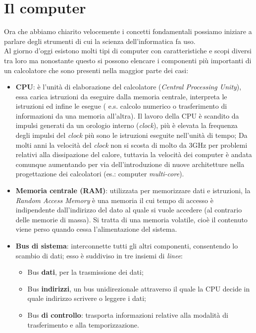 \section{Il computer}
Ora che abbiamo chiarito velocemente i concetti fondamentali possiamo iniziare a parlare degli strumenti di cui la scienza dell'informatica fa uso. \\
Al giorno d'oggi esistono molti tipi di computer con caratteristiche e scopi diversi tra loro ma nonostante questo si possono elencare i componenti più importanti di un calcolatore che sono presenti nella maggior parte dei casi:
	\begin{itemize}
	\item\textbf{CPU}: è l’unità di elaborazione del calcolatore (\textit{Central Processing Unity}), essa carica istruzioni da eseguire dalla memoria centrale, interpreta le istruzioni ed infine le esegue ( e.s. calcolo numerico o trasferimento di informazioni da una memoria all’altra).
	Il lavoro della CPU è scandito da impulsi generati da un orologio interno (\textit{clock}), più è elevata la frequenza degli impulsi del \textit{clock} più sono le istruzioni eseguite nell’unità di tempo; Da molti anni la velocità del \textit{clock} non si scosta di molto da 3GHz per problemi relativi alla dissipazione del calore, tuttavia la velocità dei computer è andata comunque aumentando per via dell'introduzione di nuove architetture nella progettazione dei calcolatori (es.: computer \textit{multi-core}).
	\item\textbf{Memoria centrale (RAM)}: utilizzata per memorizzare dati e istruzioni, la \textit{Random Access Memory} è una memoria il cui tempo di accesso è indipendente dall’indirizzo del dato al quale si vuole accedere (al contrario delle memorie di massa). Si tratta di una memoria volatile, cioè il contenuto viene perso quando cessa l’alimentazione del sistema.
	\item\textbf{Bus di sistema}: interconnette tutti gli altri componenti, consentendo lo scambio di dati; esso è suddiviso in tre insiemi di \textit{linee}: 
	\begin{itemize}
		\item Bus \textbf{dati}, per la trasmissione dei dati; 
		\item Bus \textbf{indirizzi}, un bus unidirezionale attraverso il quale la CPU decide in quale indirizzo scrivere o leggere i dati;
		\item Bus \textbf{di controllo}: trasporta informazioni relative alla modalità di trasferimento e alla temporizzazione.
	\end{itemize}

\end{itemize}

